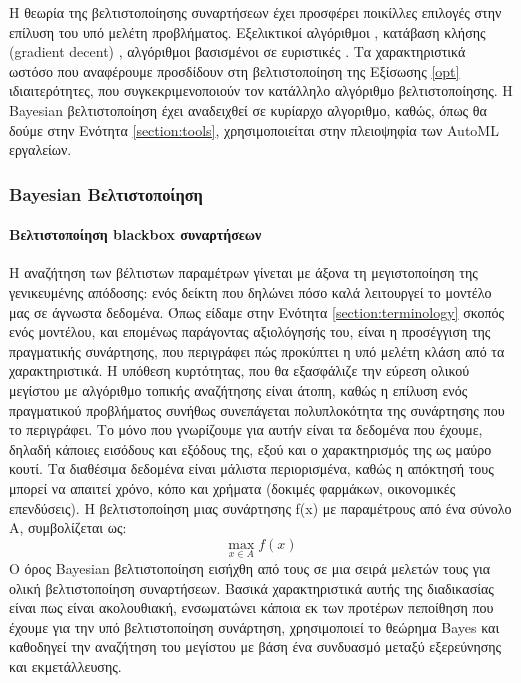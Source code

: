 	Η θεωρία της βελτιστοποίησης συναρτήσεων έχει προσφέρει ποικίλλες επιλογές στην επίλυση του υπό μελέτη προβλήματος. Eξελικτικοί αλγόριθμοι \citep{1554741}, κατάβαση κλήσης (gradient decent) \citep{wassenberg},  αλγόριθμοι βασισμένοι σε ευριστικές \citep{Nelder01011965, Huang2006}. Τα χαρακτηριστικά ωστόσο που αναφέρουμε προσδίδουν στη βελτιστοποίηση της Εξίσωσης \ref{opt} ιδιαιτερότητες, που συγκεκριμενοποιούν τον κατάλληλο αλγόριθμο βελτιστοποίησης. Η Bayesian βελτιστοποίηση έχει αναδειχθεί σε κυρίαρχο αλγοριθμο, καθώς, όπως θα δούμε στην Ενότητα \ref{section:tools}, χρησιμοποιείται στην πλειοψηφία των \gls{AutoML} εργαλείων.
 \subsubsection{Bayesian Βελτιστοποίηση}
 	\paragraph{Βελτιστοποίηση blackbox συναρτήσεων} Η αναζήτηση των βέλτιστων παραμέτρων γίνεται με άξονα τη μεγιστοποίηση της γενικευμένης απόδοσης: ενός δείκτη που δηλώνει πόσο καλά λειτουργεί το μοντέλο μας σε άγνωστα δεδομένα. Όπως είδαμε στην Ενότητα \ref{section:terminology} σκοπός ενός μοντέλου, και επομένως παράγοντας αξιολόγησής του, είναι η προσέγγιση της πραγματικής συνάρτησης, που περιγράφει πώς προκύπτει η υπό μελέτη κλάση από τα χαρακτηριστικά. Η υπόθεση κυρτότητας, που θα εξασφάλιζε την εύρεση ολικού μεγίστου με αλγόριθμο τοπικής αναζήτησης είναι άτοπη, καθώς η επίλυση ενός πραγματικού προβλήματος συνήθως συνεπάγεται πολυπλοκότητα της συνάρτησης που το περιγράφει. Το μόνο που γνωρίζουμε για αυτήν είναι τα δεδομένα που έχουμε, δηλαδή κάποιες εισόδους και εξόδους της, εξού και ο χαρακτηρισμός της ως μαύρο κουτί. Τα διαθέσιμα δεδομένα είναι μάλιστα περιορισμένα, καθώς η απόκτησή τους μπορεί να απαιτεί χρόνο, κόπο και χρήματα (δοκιμές φαρμάκων, οικονομικές επενδύσεις). Η βελτιστοποίηση μιας συνάρτησης f(x) με παραμέτρους από ένα σύνολο A, συμβολίζεται ως:
 \begin{equation}
 \max_{x \in  A } f(x)
 \end{equation}
 	Ο όρος Bayesian βελτιστοποίηση εισήχθη από τους \citet{Mockus1991} σε μια σειρά μελετών τους για ολική βελτιστοποίηση συναρτήσεων. Βασικά χαρακτηριστικά αυτής της διαδικασίας είναι πως είναι ακολουθιακή, ενσωματώνει κάποια εκ των προτέρων πεποίθηση που έχουμε για την υπό βελτιστοποίηση συνάρτηση, χρησιμοποιεί το θεώρημα Bayes και καθοδηγεί την αναζήτηση του μεγίστου με βάση ένα συνδυασμό μεταξύ εξερεύνησης και εκμετάλλευσης.
